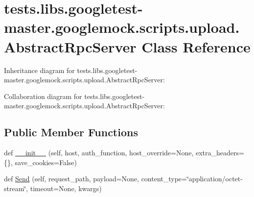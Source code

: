 \hypertarget{classtests_1_1libs_1_1googletest-master_1_1googlemock_1_1scripts_1_1upload_1_1AbstractRpcServer}{}\section{tests.\+libs.\+googletest-\/master.googlemock.\+scripts.\+upload.\+Abstract\+Rpc\+Server Class Reference}
\label{classtests_1_1libs_1_1googletest-master_1_1googlemock_1_1scripts_1_1upload_1_1AbstractRpcServer}


Inheritance diagram for tests.\+libs.\+googletest-\/master.googlemock.\+scripts.\+upload.\+Abstract\+Rpc\+Server\+:


Collaboration diagram for tests.\+libs.\+googletest-\/master.googlemock.\+scripts.\+upload.\+Abstract\+Rpc\+Server\+:
\subsection*{Public Member Functions}
\begin{DoxyCompactItemize}
\item 
def \hyperlink{classtests_1_1libs_1_1googletest-master_1_1googlemock_1_1scripts_1_1upload_1_1AbstractRpcServer_adf0b0dfc72921835be390bcccab3f73b}{\+\_\+\+\_\+init\+\_\+\+\_\+} (self, host, auth\+\_\+function, host\+\_\+override=None, extra\+\_\+headers=\{\}, save\+\_\+cookies=False)
\item 
def \hyperlink{classtests_1_1libs_1_1googletest-master_1_1googlemock_1_1scripts_1_1upload_1_1AbstractRpcServer_a23eac5b6a27e6ec2ab41f1c59920de14}{Send} (self, request\+\_\+path, payload=None, content\+\_\+type=\char`\"{}application/octet-\/stream\char`\"{}, timeout=None, kwargs)
\end{DoxyCompactItemize}
